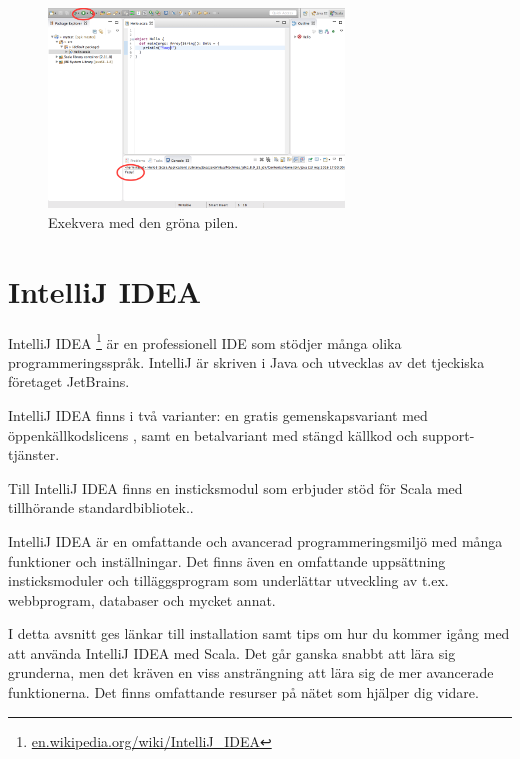 \begin{itemize}
\begin{figure}[H]
\centering
\includegraphics[width=0.7\textwidth]{../img/pirates/exekvera.png} 
\caption {Exekvera med den gröna pilen.}
\label{fig:eclipse:ide:exec}
\end{figure}
\end{itemize}

\newpage

\section{IntelliJ IDEA}\label{appendix:ide:intellij}

IntelliJ IDEA%
\footnote{\href{https://en.wikipedia.org/wiki/IntelliJ_IDEA}{en.wikipedia.org/wiki/IntelliJ\_IDEA}}
 är en professionell IDE som stödjer många olika programmeringsspråk. IntelliJ är skriven i Java och utvecklas av det tjeckiska företaget JetBrains. 

IntelliJ IDEA finns i två varianter: en gratis gemenskapsvariant med öppenkällkodslicens , samt en betalvariant med stängd källkod och support-tjänster.


Till IntelliJ IDEA finns en insticksmodul  som erbjuder stöd för Scala med tillhörande standardbibliotek..

IntelliJ IDEA är en omfattande och avancerad programmeringsmiljö med många funktioner och inställningar. Det finns även en omfattande uppsättning insticksmoduler och tilläggsprogram som underlättar utveckling av t.ex. webbprogram, databaser och mycket annat. 

I detta avsnitt ges länkar till installation samt tips om hur du kommer igång med att använda IntelliJ IDEA med Scala. Det går ganska snabbt att lära sig grunderna, men det kräven en viss ansträngning att lära sig de mer avancerade funktionerna. Det finns omfattande resurser på nätet som hjälper dig vidare. 

